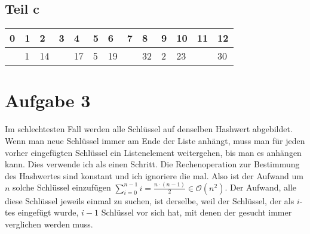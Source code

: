 \documentclass[10pt,a4paper]{article}
\begin{document}
\subsection{Teil c}
\begin{tabular}{l|l|l|l|l|l|l|l|l|l|l|l|l}
  0 & 1 & 2 & 3 & 4 & 5 & 6 & 7 & 8 & 9 & 10 & 11 & 12\\
  \hline
    & 1 & 14 &   & 17 & 5 & 19 &   & 32 & 2 & 23 &  & 30
\end{tabular}

\section{Aufgabe 3}
Im schlechtesten Fall werden alle Schlüssel auf denselben Hashwert abgebildet.
Wenn man neue Schlüssel immer am Ende der Liste anhängt, muss man für jeden vorher eingefügten Schlüssel ein Listenelement weitergehen, bis man es anhängen kann.
Dies verwende ich als einen Schritt.
Die Rechenoperation zur Bestimmung des Hashwertes sind konstant und ich ignoriere die mal.
Also ist der Aufwand um $n$ solche Schlüssel einzufügen $\sum_{i = 0}^{n - 1} i = \frac{n \cdot (n - 1)}{2} \in \mathcal{O}(n^{2})$.
Der Aufwand, alle diese Schlüssel jeweils einmal zu suchen, ist derselbe, weil der Schlüssel, der als $i$-tes eingefügt wurde, $i - 1$ Schlüssel vor sich hat, mit denen der gesucht immer verglichen werden muss.
\end{document}
